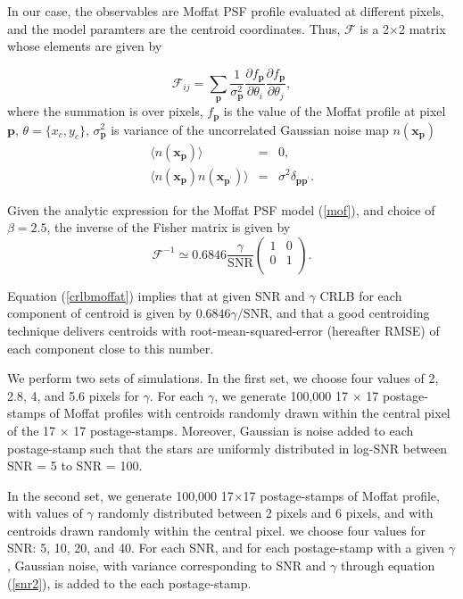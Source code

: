 \documentclass[12pt, preprint]{aastex}
\newcommand{\beq}{\begin{equation}}
\newcommand{\eeq}{\end{equation}}
\begin{document}
In our case, the observables are Moffat PSF profile evaluated at different pixels, and  
the model paramters are the centroid coordinates. Thus, $\mathcal{F}$
is a 2$\times$2 matrix whose elements are given by

\beq
  \mathcal{F}_{ij} = \sum_{\mathbf{p}}\frac{1}{\sigma_{\mathbf{p}}^{2}}
                \frac{\partial f_{\mathbf{p}}}{\partial \theta_{i}}\frac{\partial f_{\mathbf{p}}}{\partial \theta_{j}},
\label{fish}
\eeq
where the summation is over pixels, $f_{\mathbf{p}}$ is the value of the Moffat profile at pixel $\mathbf{p}$,
$\theta=\{x_{c},y_{c}\}$, $\sigma_{\mathbf{p}}^{2}$ is variance
of the uncorrelated Gaussian noise map $n(\mathbf{x_{p}})$
\begin{eqnarray}
\langle n(\mathbf{x_{p}}) \rangle &=& 0, \\
\langle n(\mathbf{x_{p}})n(\mathbf{x_{p^{\prime}}}) \rangle &=& \sigma^{2}\delta_{\mathbf{p}\mathbf{p}^{\prime}}. 
\end{eqnarray}

Given the analytic expression for the Moffat PSF model (\ref{mof}), and choice of $\beta=2.5$, 
the inverse of the Fisher matrix is given by
\beq
  \mathcal{F}^{-1} \simeq 0.6846 \frac{\gamma}{\text{SNR}} 
  \begin{pmatrix}
      1 & 0\\
      0 & 1\\
  \end{pmatrix}.
\label{crlbmoffat}
\eeq

Equation (\ref{crlbmoffat}) implies that at given SNR and $\gamma$
CRLB for each component of centroid is given by $0.6846\gamma/\text{SNR}$,
and that a good centroiding technique delivers centroids with
root-mean-squared-error (hereafter RMSE) of each component close to
this number. 

We perform two sets of simulations. In the first set, we choose four values of
2, 2.8, 4, and 5.6 pixels for $\gamma$. For each $\gamma$, we generate 100,000 
17 $\times$ 17 postage-stamps of Moffat profiles with centroids randomly drawn
within the central pixel of the 17 $\times$ 17 postage-stamps. Moreover, Gaussian
is noise added to each postage-stamp such that the stars are uniformly distributed
in log-SNR between SNR = 5 to SNR = 100.

In the second set, we generate 100,000 17$\times$17 postage-stamps
of Moffat profile, with values of $\gamma$ randomly distributed 
between 2 pixels and 6 pixels, and with centroids drawn randomly within 
the central pixel. we choose four values for SNR: 5, 10, 20, and 40. 
For each SNR, and for each postage-stamp with a given $\gamma$, 
Gaussian noise, with variance corresponding to SNR and $\gamma$ through equation 
(\ref{snr2}), is added to the each postage-stamp.
\end{document}
